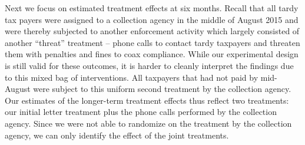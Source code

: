 \documentclass[12pt]{article}
\begin{document}
Next we focus on estimated treatment effects at six months. Recall that all tardy tax
payers were assigned to a collection agency in the middle of August
2015 and were thereby subjected to another enforcement activity which largely
consisted of another ``threat'' treatment --  phone calls to contact tardy
taxpayers and threaten them with penalties and fines to coax compliance. 
While our experimental design is still valid for these outcomes,
it is harder to cleanly interpret the findings due to this mixed bag of interventions.
All taxpayers that had not
paid by mid-August were subject to this uniform second treatment by the 
collection agency.  Our estimates of the longer-term treatment
effects thus reflect two treatments: our initial letter treatment plus
the phone calls performed by the collection agency. Since we were
not able to randomize on the treatment by the collection agency, we
can only identify the effect of the joint treatments.
\end{document}
